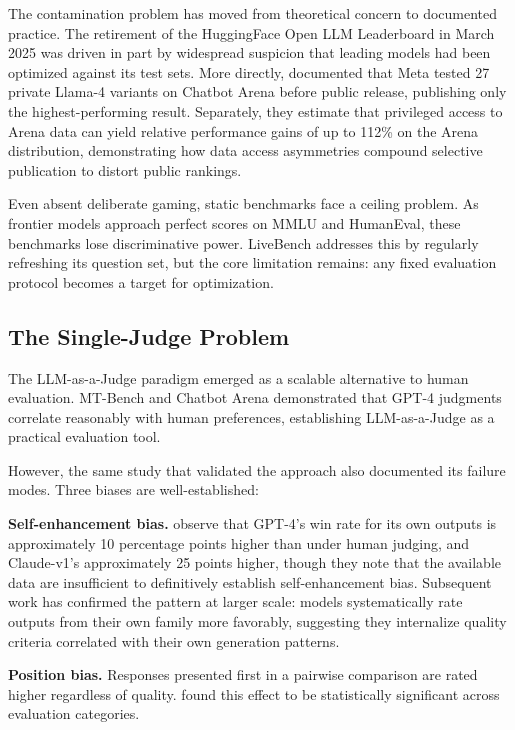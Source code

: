 \documentclass{article}
\begin{document}
The contamination problem has moved from theoretical concern to documented practice. The retirement of the HuggingFace Open LLM Leaderboard in March 2025 was driven in part by widespread suspicion that leading models had been optimized against its test sets. More directly, \citet{singh2025leaderboard} documented that Meta tested 27 private Llama-4 variants on Chatbot Arena before public release, publishing only the highest-performing result. Separately, they estimate that privileged access to Arena data can yield relative performance gains of up to 112\% on the Arena distribution, demonstrating how data access asymmetries compound selective publication to distort public rankings.

Even absent deliberate gaming, static benchmarks face a ceiling problem. As frontier models approach perfect scores on MMLU and HumanEval, these benchmarks lose discriminative power. LiveBench \citep{white2025livebench} addresses this by regularly refreshing its question set, but the core limitation remains: any fixed evaluation protocol becomes a target for optimization.

\subsection{The Single-Judge Problem}

The LLM-as-a-Judge paradigm \citep{zheng2023judging} emerged as a scalable alternative to human evaluation. MT-Bench and Chatbot Arena demonstrated that GPT-4 judgments correlate reasonably with human preferences, establishing LLM-as-a-Judge as a practical evaluation tool.

However, the same study that validated the approach also documented its failure modes. Three biases are well-established:

\textbf{Self-enhancement bias.} \citet{zheng2023judging} observe that GPT-4's win rate for its own outputs is approximately 10 percentage points higher than under human judging, and Claude-v1's approximately 25 points higher, though they note that the available data are insufficient to definitively establish self-enhancement bias. Subsequent work has confirmed the pattern at larger scale: models systematically rate outputs from their own family more favorably, suggesting they internalize quality criteria correlated with their own generation patterns.

\textbf{Position bias.} Responses presented first in a pairwise comparison are rated higher regardless of quality. \citet{zheng2023judging} found this effect to be statistically significant across evaluation categories.
\end{document}
